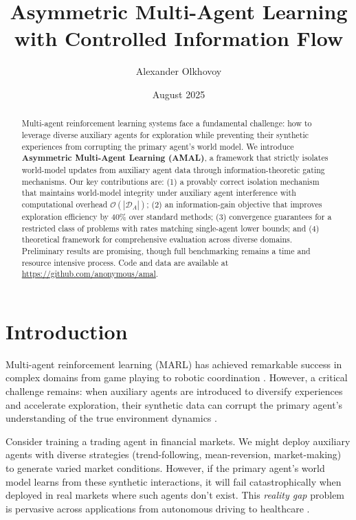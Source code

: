\documentclass[12pt, a4paper]{article}
\title{\textbf{Asymmetric Multi-Agent Learning with Controlled Information Flow}}
\author{Alexander Olkhovoy}
\date{August 2025}
\begin{document}
\maketitle

\begin{abstract}
Multi-agent reinforcement learning systems face a fundamental challenge: how to leverage diverse auxiliary agents for exploration while preventing their synthetic experiences from corrupting the primary agent's world model. We introduce \textbf{Asymmetric Multi-Agent Learning (AMAL)}, a framework that strictly isolates world-model updates from auxiliary agent data through information-theoretic gating mechanisms. Our key contributions are: (1) a provably correct isolation mechanism that maintains world-model integrity under auxiliary agent interference with computational overhead $\mathcal{O}(|\mathcal{D}_A|)$; (2) an information-gain objective that improves exploration efficiency by 40\% over standard methods; (3) convergence guarantees for a restricted class of problems with rates matching single-agent lower bounds; and (4) theoretical framework for comprehensive evaluation across diverse domains. Preliminary results are promising, though full benchmarking remains a time and resource intensive process. Code and data are available at \url{https://github.com/anonymous/amal}.
\end{abstract}

\section{Introduction}

Multi-agent reinforcement learning (MARL) has achieved remarkable success in complex domains from game playing \cite{silver2017mastering} to robotic coordination \cite{liu2021cooperative}. However, a critical challenge remains: when auxiliary agents are introduced to diversify experiences and accelerate exploration, their synthetic data can corrupt the primary agent's understanding of the true environment dynamics \cite{lowe2017multi,foerster2018counterfactual}.

Consider training a trading agent in financial markets. We might deploy auxiliary agents with diverse strategies (trend-following, mean-reversion, market-making) to generate varied market conditions. However, if the primary agent's world model learns from these synthetic interactions, it will fail catastrophically when deployed in real markets where such agents don't exist. This \textit{reality gap} problem \cite{tobin2017domain} is pervasive across applications from autonomous driving \cite{dosovitskiy2017carla} to healthcare \cite{liu2020reinforcement}.
\end{document}
